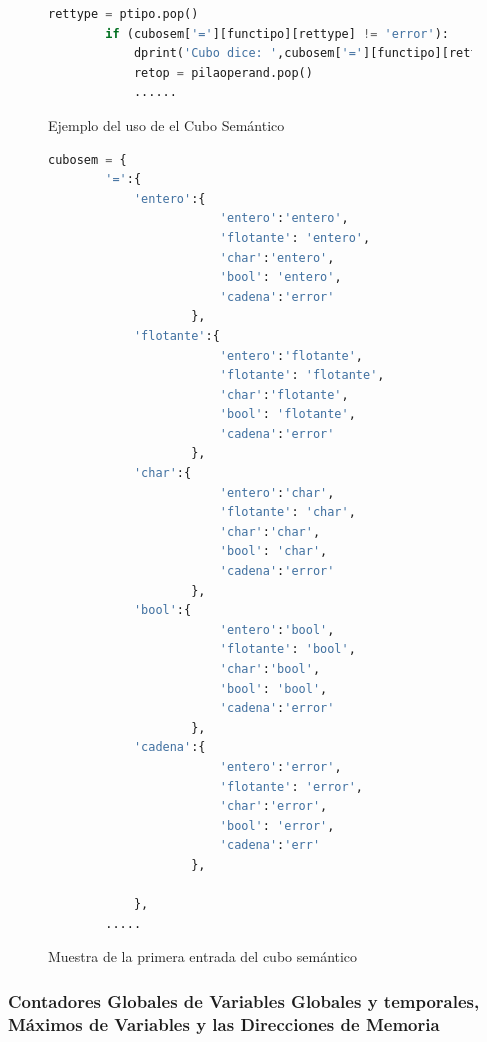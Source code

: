 \begin{figure}[htbp]
    \centering
    \begin{lstlisting}[language=Python]
        rettype = ptipo.pop()
        if (cubosem['='][functipo][rettype] != 'error'):
            dprint('Cubo dice: ',cubosem['='][functipo][rettype])
            retop = pilaoperand.pop()
            ......
    \end{lstlisting}
    \caption{Ejemplo del uso de el Cubo Semántico}
    \label{fig:my_label}
\end{figure}
\FloatBarrier
\begin{figure}[htbp]
    \centering
    \begin{lstlisting}[language=Python]
        cubosem = {
        '=':{
            'entero':{
                        'entero':'entero',
                        'flotante': 'entero',
                        'char':'entero',
                        'bool': 'entero',
                        'cadena':'error'
                    },
            'flotante':{
                        'entero':'flotante',
                        'flotante': 'flotante',
                        'char':'flotante',
                        'bool': 'flotante',
                        'cadena':'error'
                    },
            'char':{
                        'entero':'char',
                        'flotante': 'char',
                        'char':'char',
                        'bool': 'char',
                        'cadena':'error'
                    },
            'bool':{
                        'entero':'bool',
                        'flotante': 'bool',
                        'char':'bool',
                        'bool': 'bool',
                        'cadena':'error'
                    },
            'cadena':{
                        'entero':'error',
                        'flotante': 'error',
                        'char':'error',
                        'bool': 'error',
                        'cadena':'err'
                    },

            },
        .....
    \end{lstlisting}
    \caption{Muestra de la primera entrada del cubo semántico}
    \label{fig:my_label}
\end{figure}
\FloatBarrier




\subsubsection{Contadores Globales de Variables Globales y temporales, Máximos de Variables y las Direcciones de Memoria}


